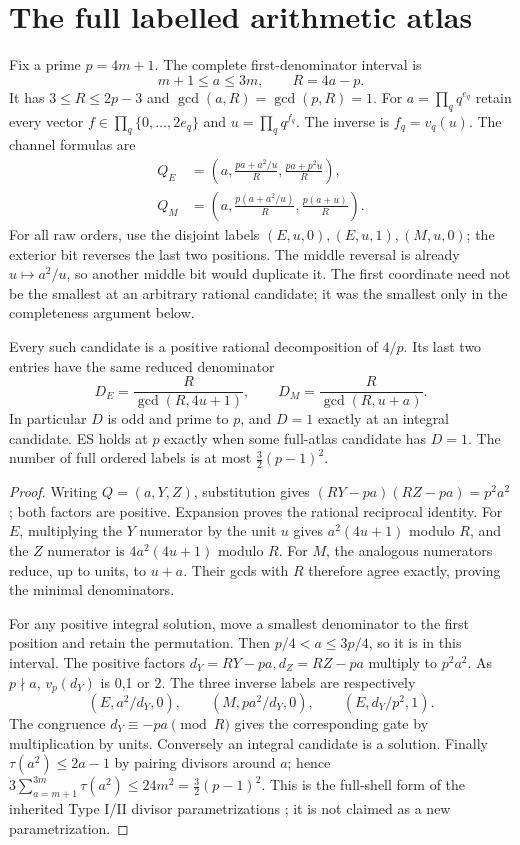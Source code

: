 \section{The full labelled arithmetic atlas}
Fix a prime $p=4m+1$. The complete first-denominator interval is
\[
 m+1\le a\le3m,\qquad R=4a-p.
\]
It has $3\le R\le2p-3$ and $\gcd(a,R)=\gcd(p,R)=1$.
For $a=\prod_q q^{e_q}$ retain every vector
$f\in\prod_q\{0,\ldots,2e_q\}$ and $u=\prod_q q^{f_q}$.
The inverse is $f_q=v_q(u)$.
The channel formulas are
\begin{align}
 Q_E&=\left(a,\frac{pa+a^2/u}{R},\frac{pa+p^2u}{R}\right),\\
 Q_M&=\left(a,\frac{p(a+a^2/u)}R,\frac{p(a+u)}R\right).
\end{align}
For all raw orders, use the disjoint labels $(E,u,0),(E,u,1),(M,u,0)$;
the exterior bit reverses the last two positions. The middle reversal is
already $u\mapsto a^2/u$, so another middle bit would duplicate it.
The first coordinate need not be the smallest at an arbitrary rational
candidate; it was the smallest only in the completeness argument below.

\begin{lemma}\label{lem:denom}
Every such candidate is a positive rational decomposition of $4/p$.
Its last two entries have the same reduced denominator
\[
 D_E=\frac R{\gcd(R,4u+1)},\qquad
 D_M=\frac R{\gcd(R,u+a)}.
\]
In particular $D$ is odd and prime to $p$, and $D=1$ exactly at an integral
candidate. ES holds at $p$ exactly when some full-atlas candidate has $D=1$.
The number of full ordered labels is at most $\tfrac32(p-1)^2$.
\end{lemma}
\begin{proof}
Writing $Q=(a,Y,Z)$, substitution gives
$(RY-pa)(RZ-pa)=p^2a^2$; both factors are positive.
Expansion proves the rational reciprocal identity.
For $E$, multiplying the $Y$ numerator by the unit $u$ gives
$a^2(4u+1)$ modulo $R$, and the $Z$ numerator is
$4a^2(4u+1)$ modulo $R$. For $M$, the analogous numerators reduce, up to
units, to $u+a$. Their gcds with $R$ therefore agree exactly, proving the
minimal denominators.

For any positive integral solution, move a smallest denominator to the
first position and retain the permutation. Then $p/4<a\le3p/4$, so it is
in this interval. The positive factors $d_Y=RY-pa,d_Z=RZ-pa$ multiply to
$p^2a^2$. As $p\nmid a$, $v_p(d_Y)$ is 0,1 or 2. The three inverse labels
are respectively
\[
 (E,a^2/d_Y,0),\qquad (M,pa^2/d_Y,0),\qquad(E,d_Y/p^2,1).
\]
The congruence $d_Y\equiv-pa\pmod R$ gives the corresponding gate by
multiplication by units. Conversely an integral candidate is a solution.
Finally $\tau(a^2)\le2a-1$ by pairing divisors around $a$; hence
$3\sum_{a=m+1}^{3m}\tau(a^2)\le24m^2=\tfrac32(p-1)^2$.
This is the full-shell form of the inherited Type I/II divisor
parametrizations \cite[\S2]{et}; it is not claimed as a new parametrization.
\end{proof}

